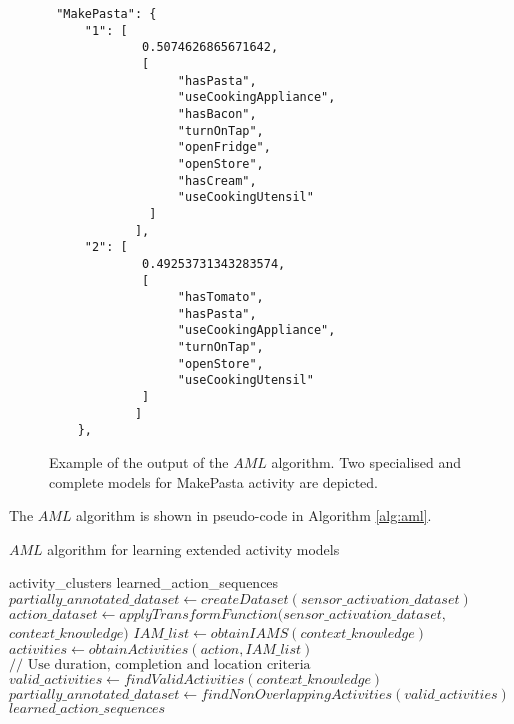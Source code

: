 \begin{figure}[htbp]
\begin{small}
\begin{lstlisting}
 "MakePasta": {
     "1": [          
             0.5074626865671642, 
             [
                  "hasPasta", 
                  "useCookingAppliance", 
                  "hasBacon", 
                  "turnOnTap", 
                  "openFridge", 
                  "openStore", 
                  "hasCream", 
                  "useCookingUtensil"
              ]
            ],
     "2": [
             0.49253731343283574, 
             [
                  "hasTomato", 
                  "hasPasta", 
                  "useCookingAppliance", 
                  "turnOnTap", 
                  "openStore", 
                  "useCookingUtensil"
             ]
            ]        
    }, 

\end{lstlisting}
\end{small}
\caption{Example of the output of the $AML$ algorithm. Two specialised and complete models for MakePasta activity are depicted.}
\label{fig-aml-output}
\end{figure}

The $AML$ algorithm is shown in pseudo-code in Algorithm \ref{alg:aml}.

\begin{algorithm}
 \caption{$AML$ algorithm for learning extended activity models}
 \label{alg:aml}
 \begin{algorithmic}
 \REQUIRE activity\_clusters
 \ENSURE learned\_action\_sequences
 \STATE $partially\_annotated\_dataset \leftarrow createDataset(sensor\_activation\_dataset)$
 \STATE $action\_dataset \leftarrow applyTransformFunction(sensor\_activation\_dataset,$ 
 $context\_knowledge)$
 \STATE $IAM\_list \leftarrow obtainIAMS(context\_knowledge)$
    \STATE $activities \leftarrow obtainActivities(action, IAM\_list)$
  \ENDIF
    \STATE $// \text{ Use duration, completion and location criteria}$
    \STATE $valid\_activities \leftarrow findValidActivities(context\_knowledge)$
  \ENDFOR
 \ENDFOR
 \STATE $partially\_annotated\_dataset \leftarrow findNonOverlappingActivities(valid\_activities)$
 \RETURN $learned\_action\_sequences$
 \end{algorithmic}
\end{algorithm}